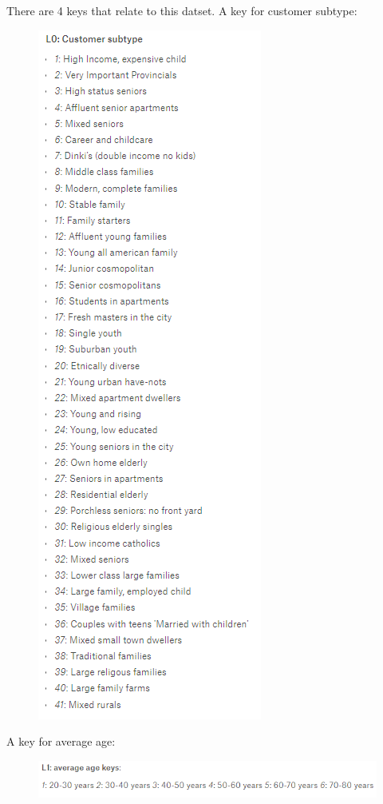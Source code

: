 \documentclass{article}\usepackage[]{graphicx}\usepackage[]{color}
\begin{document}
There are 4 keys that relate to this datset. A key for customer subtype:
\begin{figure}[H]
\includegraphics{images/customersubtype.png}
\end{figure}
A key for average age:
\begin{figure}[H]
\includegraphics{images/averageage.png}
\end{figure}
\end{document}
